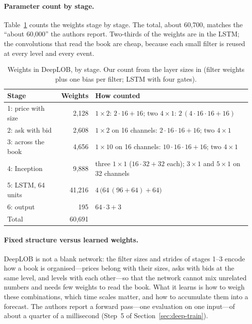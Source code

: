 \paragraph{Parameter count by stage.} Table~\ref{tab:deeplob-params} counts the weights stage by stage. The total, about
60,700, matches the ``about 60,000'' the authors report. Two-thirds of the weights are in the LSTM; the convolutions
that read the book are cheap, because each small filter is reused at every level and every event.

\begin{table}[!htbp]
\centering\footnotesize
\caption{Weights in DeepLOB, by stage. Our count from the layer sizes in \citet{zhang2019} (filter weights plus one
bias per filter; LSTM with four gates).}
\label{tab:deeplob-params}
\begin{tabular}{lrl}
\toprule
Stage & Weights & How counted \\
\midrule
1: price with size & 2,128 & $1\times2$: $2\cdot16+16$; two $4\times1$: $2\,(4\cdot16\cdot16+16)$ \\
2: ask with bid & 2,608 & $1\times2$ on 16 channels: $2\cdot16\cdot16+16$; two $4\times1$ \\
3: across the book & 4,656 & $1\times10$ on 16 channels: $10\cdot16\cdot16+16$; two $4\times1$ \\
4: Inception & 9,888 & three $1\times1$ ($16\cdot32+32$ each); $3\times1$ and $5\times1$ on 32 channels \\
5: LSTM, 64 units & 41,216 & $4\,\big(64\,(96+64)+64\big)$ \\
6: output & 195 & $64\cdot3+3$ \\
\midrule
Total & 60,691 & \\
\bottomrule
\end{tabular}
\end{table}

\paragraph{Fixed structure versus learned weights.} DeepLOB is not a blank network: the filter sizes and strides of
stages 1--3 encode how a book is organised---prices belong with their sizes, asks with bids at the same level, and
levels with each other---so that the network cannot mix unrelated numbers and needs few weights to read the book.
What it learns is how to weigh these combinations, which time scales matter, and how to accumulate them into a
forecast. The authors report a forward pass---one evaluation on one input---of about a quarter of a millisecond
(Step~5 of Section~\ref{sec:deep-train}).

